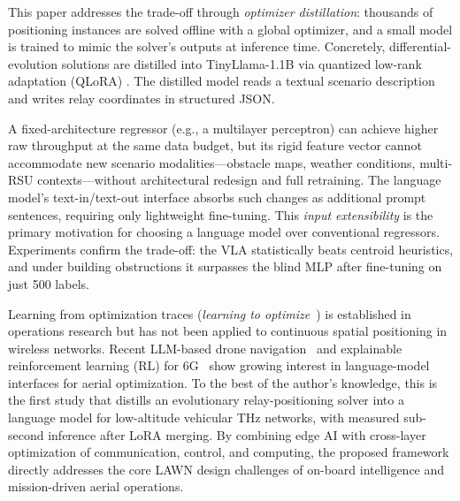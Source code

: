 \documentclass[journal]{IEEEtran}
\begin{document}
This paper addresses the trade-off through \emph{optimizer distillation}: thousands of positioning instances are solved offline with a global optimizer, and a small model is trained to mimic the solver's outputs at inference time. Concretely, differential-evolution solutions are distilled into TinyLlama-1.1B \cite{zhang2024tinyllama} via quantized low-rank adaptation (QLoRA) \cite{dettmers2023qlora}. The distilled model reads a textual scenario description and writes relay coordinates in structured JSON.

A fixed-architecture regressor (e.g., a multilayer perceptron) can achieve higher raw throughput at the same data budget, but its rigid feature vector cannot accommodate new scenario modalities---obstacle maps, weather conditions, multi-RSU contexts---without architectural redesign and full retraining. The language model's text-in/text-out interface absorbs such changes as additional prompt sentences, requiring only lightweight fine-tuning. This \emph{input extensibility} is the primary motivation for choosing a language model over conventional regressors. Experiments confirm the trade-off: the VLA statistically beats centroid heuristics, and under building obstructions it surpasses the blind MLP after fine-tuning on just 500 labels.

Learning from optimization traces (\emph{learning to optimize}~\cite{bengio2021}) is established in operations research but has not been applied to continuous spatial positioning in wireless networks. Recent LLM-based drone navigation~\cite{khan2025llmnav} and explainable reinforcement learning (RL) for 6G~\cite{aranacatania2025xdrl} show growing interest in language-model interfaces for aerial optimization. To the best of the author's knowledge, this is the first study that distills an evolutionary relay-positioning solver into a language model for low-altitude vehicular THz networks, with measured sub-second inference after LoRA merging. By combining edge AI with cross-layer optimization of communication, control, and computing, the proposed framework directly addresses the core LAWN design challenges of on-board intelligence and mission-driven aerial operations.
\end{document}
